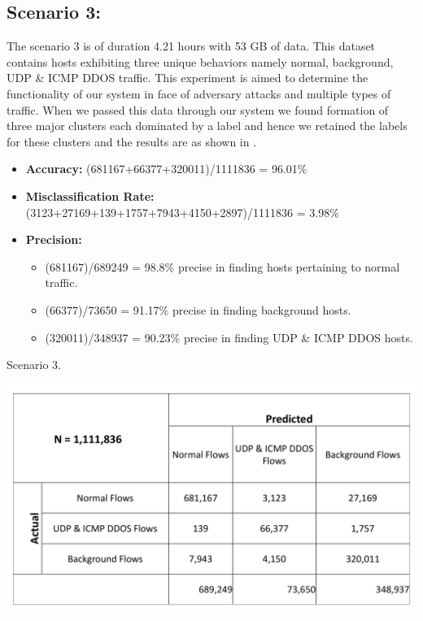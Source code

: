 \subsection{Scenario 3:}
The scenario 3 is of duration 4.21 hours with 53 GB of data. This dataset contains hosts exhibiting three unique behaviors namely normal, background, UDP \& ICMP DDOS  traffic. This experiment is aimed to determine the functionality of our system in face of adversary attacks and multiple types of traffic. When we passed this data through our system we found formation of three major clusters each dominated by a label and hence we retained the labels for these clusters and the results are as shown in .

\begin{itemize}
	\item \textbf{Accuracy:}  (681167+66377+320011)/1111836 = 96.01\%
	
	\item \textbf{Misclassification Rate:} (3123+27169+139+1757+7943+4150+2897)/1111836 = 3.98\%
	
	\item \textbf{Precision:} 
	\begin{itemize}	
		
		
		\item (681167)/689249 = 98.8\% precise in finding hosts pertaining to normal traffic.
		
		\item (66377)/73650 = 91.17\% precise in finding background hosts.
		
		\item (320011)/348937 = 90.23\% precise in finding UDP \& ICMP DDOS hosts.
		
	\end{itemize}
	
\end{itemize}
\begin{table}[t]
	\caption{Scenario 3.}%
	\centerline{\includegraphics[scale = 0.4]{scenario3.pdf}}	
\end{table}


